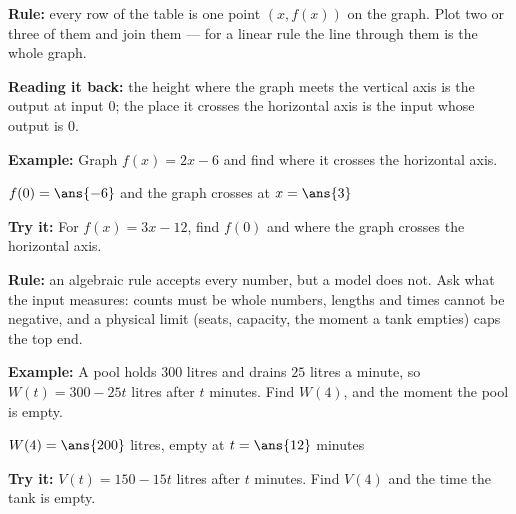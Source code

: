 \documentclass[12pt]{article}
\begin{document}

\begin{formulabox}
\textbf{Rule:} every row of the table is one point $(x, f(x))$ on the graph. Plot two or three of them and join them --- for a linear rule the line through them is the whole graph.\par
\textbf{Reading it back:} the height where the graph meets the vertical axis is the output at input $0$; the place it crosses the horizontal axis is the input whose output is $0$.
\end{formulabox}

\begin{examplebox}
\textbf{Example:} \quad Graph $f(x) = 2x - 6$ and find where it crosses the horizontal axis.

$f(0) = \ans{-6}$ \quad and the graph crosses at \quad $x = \ans{3}$
\end{examplebox}

\begin{tryitbox}
\textbf{Try it:} \quad For $f(x) = 3x - 12$, find $f(0)$ and where the graph crosses the horizontal axis.\\[2pt]
\end{tryitbox}


\begin{formulabox}
\textbf{Rule:} an algebraic rule accepts every number, but a model does not. Ask what the input measures: counts must be whole numbers, lengths and times cannot be negative, and a physical limit (seats, capacity, the moment a tank empties) caps the top end.
\end{formulabox}

\begin{examplebox}
\textbf{Example:} \quad A pool holds $300$ litres and drains $25$ litres a minute, so $W(t) = 300 - 25t$ litres after $t$ minutes. Find $W(4)$, and the moment the pool is empty.

$W(4) = \ans{200}$ litres, empty at \quad $t = \ans{12}$ minutes
\end{examplebox}

\begin{tryitbox}
\textbf{Try it:} \quad $V(t) = 150 - 15t$ litres after $t$ minutes. Find $V(4)$ and the time the tank is empty.\\[2pt]
\end{tryitbox}
\end{document}
